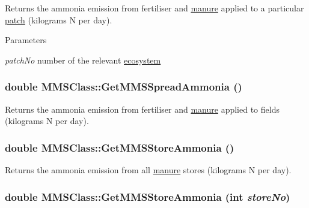 Returns the ammonia emission from fertiliser and \hyperlink{classmanure}{manure} applied to a particular \hyperlink{classpatch}{patch} (kilograms N per day). 
\begin{DoxyParams}{Parameters}
\item[{\em patchNo}]number of the relevant \hyperlink{classecosystem}{ecosystem} \end{DoxyParams}
\hypertarget{class_m_m_s_class_a3f8f600885ab389f35329527a720caa5}{
\subsubsection[{GetMMSSpreadAmmonia}]{\setlength{\rightskip}{0pt plus 5cm}double MMSClass::GetMMSSpreadAmmonia ()}}
\label{class_m_m_s_class_a3f8f600885ab389f35329527a720caa5}


Returns the ammonia emission from fertiliser and \hyperlink{classmanure}{manure} applied to fields (kilograms N per day). \hypertarget{class_m_m_s_class_a9681bb2179235730d1c4fb14e4616b42}{
\subsubsection[{GetMMSStoreAmmonia}]{\setlength{\rightskip}{0pt plus 5cm}double MMSClass::GetMMSStoreAmmonia ()}}
\label{class_m_m_s_class_a9681bb2179235730d1c4fb14e4616b42}


Returns the ammonia emission from all \hyperlink{classmanure}{manure} stores (kilograms N per day). \hypertarget{class_m_m_s_class_a4792c66bdc3f9b80a947d9ad83c6f708}{
\subsubsection[{GetMMSStoreAmmonia}]{\setlength{\rightskip}{0pt plus 5cm}double MMSClass::GetMMSStoreAmmonia (int {\em storeNo})}}
\label{class_m_m_s_class_a4792c66bdc3f9b80a947d9ad83c6f708}


